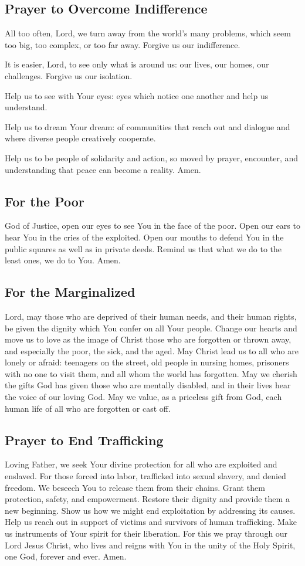 \documentclass[12pt]{article}
\newcommand{\prayertitle}[1]{\subsection{#1}}
\begin{document}
\prayertitle{Prayer to Overcome Indifference}
\label{prayer:indifference}
All too often, Lord, we turn away from the world's many problems, which seem too big, too complex, or too far away.
Forgive us our indifference.

It is easier, Lord, to see only what is around us:
our lives, our homes, our challenges.
Forgive us our isolation.

Help us to see with Your eyes:
eyes which notice one another and help us understand.

Help us to dream Your dream:
of communities that reach out and dialogue and where diverse people creatively cooperate.

Help us to be people of solidarity and action, so moved by prayer, encounter, and understanding that peace can become a reality.
Amen.

\prayertitle{For the Poor}
\label{prayer:poor}
God of Justice, open our eyes to see You in the face of the poor.
Open our ears to hear You in the cries of the exploited.
Open our mouths to defend You in the public squares as well as in private deeds.
Remind us that what we do to the least ones, we do to You.
Amen.

\prayertitle{For the Marginalized}
\label{prayer:marginalized}
Lord, may those who are deprived of their human needs, and their human rights, be given the dignity which You confer on all Your people.
Change our hearts and move us to love as the image of Christ those who are forgotten or thrown away, and especially the poor, the sick, and the aged.
May Christ lead us to all who are lonely or afraid: teenagers on the street, old people in nursing homes, prisoners with no one to visit them, and all whom the world has forgotten.
May we cherish the gifts God has given those who are mentally disabled,
and in their lives hear the voice of our loving God.
May we value, as a priceless gift from God, each human life of all who are forgotten or cast off.

\prayertitle{Prayer to End Trafficking}
\label{prayer:trafficking}
Loving Father, we seek Your divine protection for all who are exploited and enslaved.
For those forced into labor, trafficked into sexual slavery, and denied freedom.
We beseech You to release them from their chains.
Grant them protection, safety, and empowerment.
Restore their dignity and provide them a new beginning.
Show us how we might end exploitation by addressing its causes.
Help us reach out in support of victims and survivors of human trafficking.
Make us instruments of Your spirit for their liberation.
For this we pray through our Lord Jesus Christ, who lives and reigns with You in the unity of the Holy Spirit, one God, forever and ever.
Amen.
\end{document}
